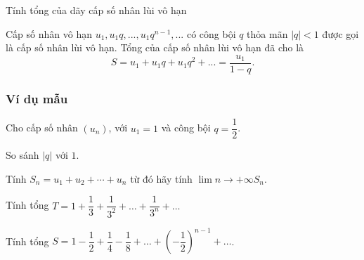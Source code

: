 \begin{dang}{Tính tổng của dãy cấp số nhân lùi vô hạn}
	\begin{dn}
		Cấp số nhân vô hạn $u_1, u_1q,...,u_1q^{n-1},...$ có công bội $q$ thỏa mãn $|q|<1$ được gọi là cấp số nhân lùi vô hạn. 
		Tổng của cấp số nhân lùi vô hạn đã cho là $$S=u_1+u_1q+u_1q^2+...=\dfrac{u_1}{1-q}.$$
	\end{dn}
\end{dang}
\subsubsection{Ví dụ mẫu}
\begin{vd}%
	Cho cấp số nhân $(u_n)$, với $u_1=1$ và công bội $q=\dfrac{1}{2}$.
	\begin{enumEX}{1}
		\item So sánh $\left|q\right|$ với $1$.
		\item Tính $S_n=u_1+u_2+\cdots+u_n$ từ đó hãy tính $\lim \limits{n \to +\infty}S_n$.
	\end{enumEX}
\end{vd}
\begin{vd}%
	Tính tổng $T=1+\dfrac{1}{3}+\dfrac{1}{3^2}+\ldots+\dfrac{1}{3^n}+\ldots$
\end{vd}
\begin{vd}
	Tính tổng $S=1-\dfrac{1}{2}+\dfrac{1}{4}-\dfrac{1}{8}+\ldots+\left(-\dfrac{1}{2}\right)^{n-1}+\ldots$.
\end{vd}

